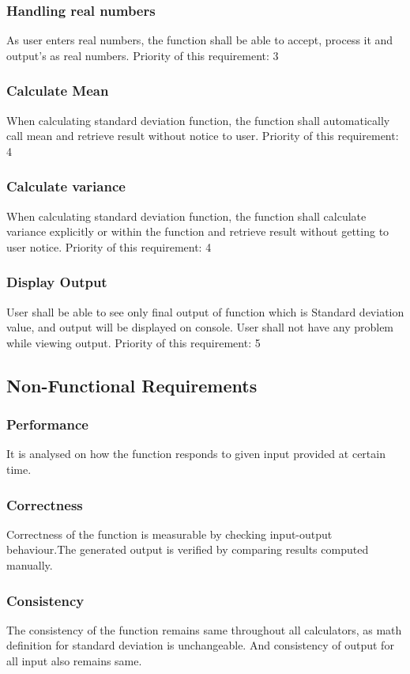 \documentclass[a4paper,12pt]{article}
\begin{document}
\begin{titlepage}
\subsubsection{Handling real numbers}
As user enters real numbers, the function shall be able to accept, process it and output's as real numbers.\newline
Priority of this requirement: 3
\subsubsection{Calculate Mean}
When calculating standard deviation function, the function shall automatically call mean and retrieve result without notice to user. \newline
Priority of this requirement: 4
\subsubsection{Calculate variance}
When calculating standard deviation function, the function shall calculate variance explicitly or within the function and retrieve result without getting to user notice. \newline
Priority of this requirement: 4
\subsubsection{Display Output}
User shall be able to see only final output of function which is Standard deviation value, and output will be displayed on console. User shall not have any problem while viewing output. \newline
Priority of this requirement: 5
\subsection{Non-Functional Requirements}
\subsubsection{Performance}
It is analysed on how the function responds to given input provided at certain time. 
\subsubsection{Correctness}
Correctness of the function is measurable by checking input-output behaviour.The generated output is verified by comparing results computed manually.
\subsubsection{Consistency}
The consistency of the function remains same throughout all calculators, as math definition for standard deviation is unchangeable. And consistency of output for all input also remains same.

\end{titlepage}
\end{document}
